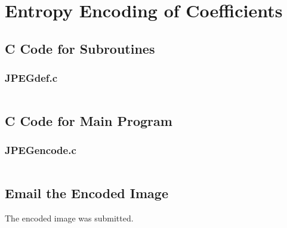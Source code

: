 \documentclass{article}
\begin{document}

\section{Entropy Encoding of Coefficients}
	\subsection{C Code for Subroutines}
		\subsubsection{JPEGdef.c}
			\inputminted[tabsize=2]{c}{../source/jpeg/JPEGdefs.c}
	\subsection{C Code for Main Program}
		\subsubsection{JPEGencode.c}
			\inputminted[tabsize=2]{c}{../source/jpeg/JPEG_encode.c}
	\subsection{Email the Encoded Image}
		The encoded image was submitted.
\pagebreak
\end{document}
